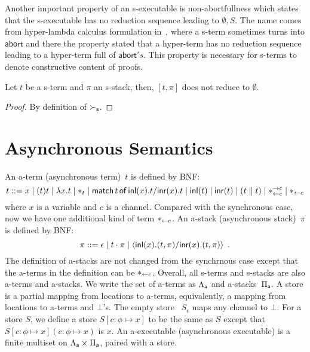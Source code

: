 
Another important property of an s-executable is
non-abortfullness
which states that the s-executable has no reduction sequence leading to
$\emptyset,S$.
The name comes from hyper-lambda calculus formulation in~\citep{hiraiflops2012},
where a s-term sometimes turns into $\mathsf{abort}$ and there the property
stated that a hyper-term has no reduction sequence leading to a hyper-term
full of $\mathsf{abort}'s$.
This property is necessary for s-terms to denote
constructive content of proofs.

\begin{proposition}
 Let $t$ be a s-term and $\pi$ an s-stack, then,
 $[t,\pi]$ does not reduce to $\emptyset$.
\end{proposition}
\begin{proof}
 By definition of $\succ_{\mathsf s}$.
\end{proof}

\section{Asynchronous Semantics}
\label{sec:async}

An a-term (asynchronous term)~$t$ is defined by BNF:
\[
 t::= x
 \mid (t)t
 \mid \lambda x.t
 \mid \ast_t
 \mid \mathsf{match}\,{t}\,\mathsf{of}\, \mathsf{inl}({x}). {t}/ \mathsf{inr}({x}). {t}
 \mid \mathsf{inl}({t})
 \mid \mathsf{inr}({t})
 \mid (t\parallel t)
 \mid \ast^{\rightarrow {c}}_{\leftarrow{c}}
 \mid \ast_{\leftarrow{c}}
\]
where $x$ is a variable and $c$ is a channel.
Compared with the synchronous case, now we have one additional kind of term
$\ast_{\leftarrow{c}}$.
An a-stack (asynchronous stack)~$\pi$ is defined by BNF:
\[
 \pi ::= \epsilon
 \mid t\cdot \pi
 \mid \langle \mathsf{inl}({x}). ({t},{\pi})/ \mathsf{inr}({x}). ({t},{\pi})\rangle
 \enspace.
\]
The definition of a-stacks are not changed from the synchrnous case except
that the a-terms in the definition can be $\ast_{\leftarrow{c}}$.
Overall, all s-terms and s-stacks are also a-terms and a-stacks.
We write the set of a-terms as $\Lambda_{\mathsf a}$ and a-stacks~$\Pi_{\mathsf a}$.
A store is a partial mapping from locations to
a-terms, equivalently, a mapping from locations to a-terms and $\bot$'s.
The empty store%
~$S_\epsilon$ maps any channel to $\bot$.
For a store $S$, we define a store $S[c\colon\phi\mapsto x]$ to be
the same as $S$ except that $S[c\colon\phi\mapsto x](c\colon\phi\mapsto
x)$ is $x$.
An a-executable (asynchronous executable)
is a finite multiset on $\Lambda_{\mathsf a} \times \Pi_{\mathsf a}$,
paired with a store.


